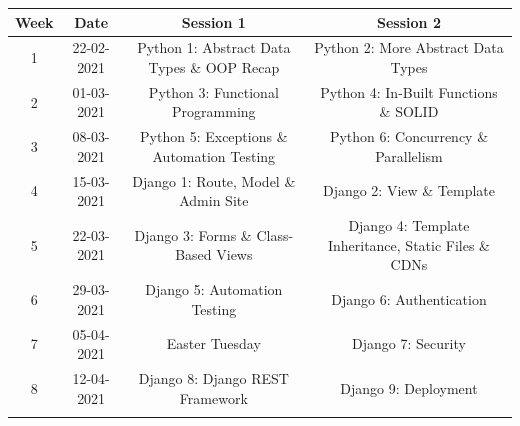 \documentclass{article}
\begin{document}
\renewcommand{\arraystretch}{1.5}
\begin{tabular}{|c|c|c|c|}
	\hline
	\textbf{Week} & \textbf{Date}     & \textbf{Session 1}                                & \textbf{Session 2}                                          \\ \hline
	\small 1      & \small 22-02-2021 & \small Python 1: Abstract Data Types \& OOP Recap & \small Python 2: More Abstract Data Types                   \\ \hline
	\small 2      & \small 01-03-2021 & \small Python 3: Functional Programming           & \small Python 4: In-Built Functions \& SOLID                \\ \hline
	\small 3      & \small 08-03-2021 & \small Python 5: Exceptions \& Automation Testing & \small Python 6: Concurrency \& Parallelism                 \\ \hline
	\small 4      & \small 15-03-2021 & \small Django 1: Route, Model \& Admin Site       & \small Django 2: View \& Template                           \\ \hline
	\small 5      & \small 22-03-2021 & \small Django 3: Forms \& Class-Based Views       & \small Django 4: Template Inheritance, Static Files \& CDNs \\ \hline
	\small 6      & \small 29-03-2021 & \small Django 5: Automation Testing               & \small Django 6: Authentication                             \\ \hline
	\small 7      & \small 05-04-2021 & \small  \cellcolor{yellow} \small Easter Tuesday  & \small Django 7: Security                                   \\ \hline
	\small 8      & \small 12-04-2021 & \small Django 8: Django REST Framework            & \small Django 9: Deployment                                 \\ \hline
	\rowcolor{yellow} \multicolumn{4}{|c|}{\small Mid Term Break}                                                             \\ \hline
		

\end{tabular}
\end{document}
